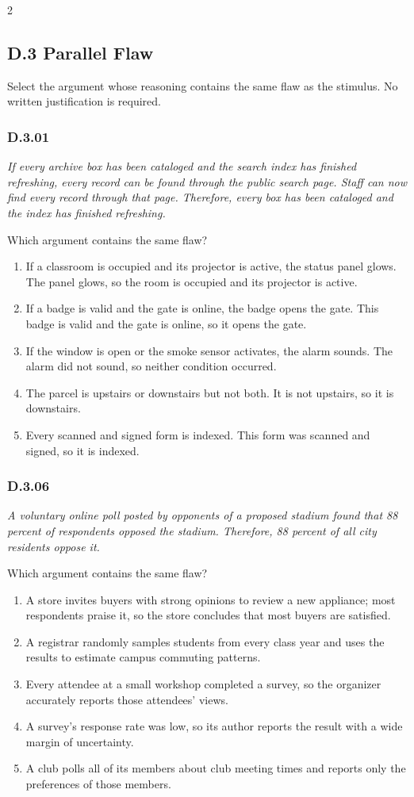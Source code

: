 \documentclass[10pt]{extarticle}
\newcommand{\choice}[1]{\item #1}
\newcommand{\bankitem}[1]{\subsubsection*{#1}}
\begin{document}
\begin{multicols}{2}
\subsection*{D.3 Parallel Flaw}
Select the argument whose reasoning contains the same flaw as the stimulus. No written justification is required.
\begin{samepage}
\bankitem{D.3.01}
\emph{If every archive box has been cataloged and the search index has finished refreshing, every record can be found through the public search page. Staff can now find every record through that page. Therefore, every box has been cataloged and the index has finished refreshing.}

Which argument contains the same flaw?
\begin{enumerate}[label=(\alph*)]
  \choice{If a classroom is occupied and its projector is active, the status panel glows. The panel glows, so the room is occupied and its projector is active.}
  \choice{If a badge is valid and the gate is online, the badge opens the gate. This badge is valid and the gate is online, so it opens the gate.}
  \choice{If the window is open or the smoke sensor activates, the alarm sounds. The alarm did not sound, so neither condition occurred.}
  \choice{The parcel is upstairs or downstairs but not both. It is not upstairs, so it is downstairs.}
  \choice{Every scanned and signed form is indexed. This form was scanned and signed, so it is indexed.}
\end{enumerate}
\end{samepage}\par\smallskip
\begin{samepage}
\bankitem{D.3.06}
\emph{A voluntary online poll posted by opponents of a proposed stadium found that 88 percent of respondents opposed the stadium. Therefore, 88 percent of all city residents oppose it.}

Which argument contains the same flaw?
\begin{enumerate}[label=(\alph*)]
  \choice{A store invites buyers with strong opinions to review a new appliance; most respondents praise it, so the store concludes that most buyers are satisfied.}
  \choice{A registrar randomly samples students from every class year and uses the results to estimate campus commuting patterns.}
  \choice{Every attendee at a small workshop completed a survey, so the organizer accurately reports those attendees' views.}
  \choice{A survey's response rate was low, so its author reports the result with a wide margin of uncertainty.}
  \choice{A club polls all of its members about club meeting times and reports only the preferences of those members.}
\end{enumerate}
\end{samepage}\par\smallskip

\end{multicols}
\end{document}
